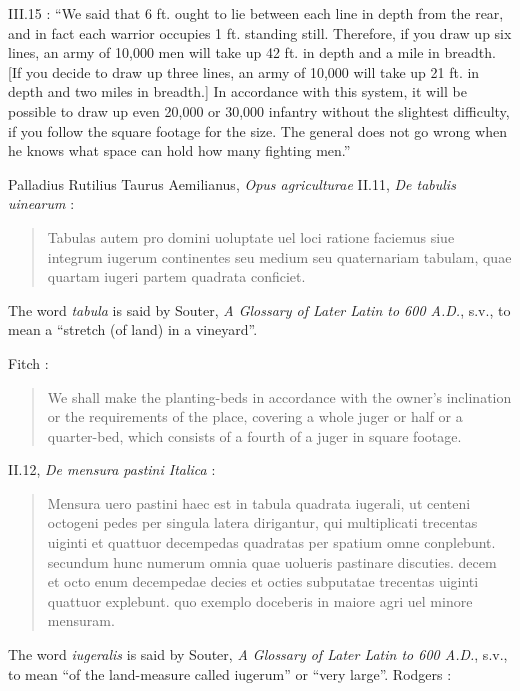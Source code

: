 III.15 \cite[p.~97]{vegetius}: ``We said that 6 ft. ought to lie between each line in depth from the rear, and in fact each
warrior occupies 1 ft. standing still. Therefore, if you draw up six lines, an army of 10,000 men will take up 42 ft.
in depth and a mile in breadth. [If you decide to draw up three lines, an army of 10,000 will take up 21 ft. in depth and two
miles in breadth.] In accordance with this system, it will be possible to draw up even 20,000 or 30,000 infantry without the slightest
difficulty, if you follow the square footage for the size. The general does not go wrong when he knows what space
can hold how many fighting men.'' 

Palladius Rutilius Taurus Aemilianus, {\em Opus agriculturae} II.11, {\em De tabulis uinearum} \cite[p.~54]{palladii}:

\begin{quote}
Tabulas autem pro domini uoluptate uel loci ratione
faciemus siue integrum iugerum continentes seu medium
seu quaternariam tabulam, quae quartam iugeri partem
quadrata conficiet.
\end{quote}

The word {\em tabula} is said by Souter, {\em A Glossary of Later Latin to 600 A.D.}, s.v., to mean a ``stretch (of land) in a vineyard''.

Fitch \cite[p.~75]{fitch}:

\begin{quote}
We shall make the planting-beds in accordance with the owner's inclination or the requirements of the place, covering a whole juger or half or a quarter-bed, which consists of a fourth of a juger in square footage. 
\end{quote}

II.12, {\em De mensura pastini Italica} \cite[p.~55]{palladii}:

\begin{quote}
Mensura uero pastini haec est in tabula quadrata iugerali,
ut centeni octogeni pedes per singula latera dirigantur,
qui multiplicati trecentas uiginti et quattuor decempedas
quadratas per spatium omne conplebunt.
secundum hunc numerum omnia quae uolueris pastinare discuties.
decem et octo enum decempedae decies et octies subputatae
trecentas uiginti quattuor explebunt.
quo exemplo doceberis in maiore agri uel minore mensuram. 
\end{quote}

The word {\em iugeralis} is said by Souter, {\em A Glossary of Later Latin to 600 A.D.}, s.v., to mean ``of the land-measure called iugerum'' or ``very large''. 
Rodgers \cite[p.~96]{palladius}:

